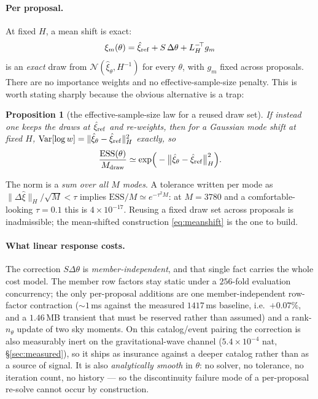 \documentclass[11pt]{article}
\newtheorem{proposition}{Proposition}
\theoremstyle{definition}
\theoremstyle{remark}
\newcommand{\Mdraw}{M_{\rm draw}}
\newcommand{\Var}{\mathrm{Var}}
\newcommand{\ESS}{\mathrm{ESS}}
\begin{document}
\paragraph{Per proposal.} At fixed $H$, a mean shift is exact:
\begin{equation}
  \xi_m(\theta)=\hat\xi_{\rm ref}+S\,\Delta\theta+L_H^{-\!\top}g_m
  \label{eq:meanshift}
\end{equation}
is an \emph{exact} draw from $\mathcal N(\hat\xi_\theta,H^{-1})$ for every $\theta$,
with $g_m$ fixed across proposals. There are no importance weights and no
effective-sample-size penalty. This is worth stating sharply because the obvious
alternative is a trap:

\begin{proposition}[the effective-sample-size law for a reused draw set]
\label{prop:esslaw}
If instead one keeps the draws at $\hat\xi_{\rm ref}$ and re-weights, then for a
Gaussian mode shift at fixed $H$,
$\Var[\log w]=\|\hat\xi_\theta-\hat\xi_{\rm ref}\|_H^2$ exactly, so
\begin{equation}
  \frac{\ESS(\theta)}{\Mdraw}\simeq
  \exp\!\Big(-\big\|\hat\xi_\theta-\hat\xi_{\rm ref}\big\|_H^2\Big).
  \label{eq:esslaw}
\end{equation}
\end{proposition}

\noindent The norm is a \emph{sum over all $M$ modes}. A tolerance written per mode
as $\|\Delta\hat\xi\|_H/\sqrt M<\tau$ implies $\ESS/M\simeq e^{-\tau^2M}$: at
$M=3780$ and a comfortable-looking $\tau=0.1$ this is $4\times10^{-17}$. Reusing a
fixed draw set across proposals is inadmissible; the mean-shifted construction
\eqref{eq:meanshift} is the one to build.

\paragraph{What linear response costs.} The correction $S\Delta\theta$ is
\emph{member-independent}, and that single fact carries the whole cost model. The
member row factors stay static under a $256$-fold evaluation concurrency; the only
per-proposal additions are one member-independent row-factor contraction
($\sim1$\,ms against the measured $1417$\,ms baseline, i.e.\ $+0.07\%$, and a
$1.46$\,MB transient that must be reserved rather than assumed) and a
rank-$n_\theta$ update of two sky moments. On this catalog/event pairing the
correction is also measurably inert on the gravitational-wave channel
($5.4\times10^{-4}$ nat, \S\ref{sec:measured}), so it ships as insurance against
a deeper catalog rather than as a source of signal. It is also \emph{analytically smooth} in $\theta$: no solver, no
tolerance, no iteration count, no history --- so the discontinuity failure mode of a
per-proposal re-solve cannot occur by construction.
\end{document}
